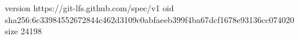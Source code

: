 version https://git-lfs.github.com/spec/v1
oid sha256:6c33984552672844c462d3109c0abfaeeb399f4ba67dcf1678e93136cc074020
size 24198
